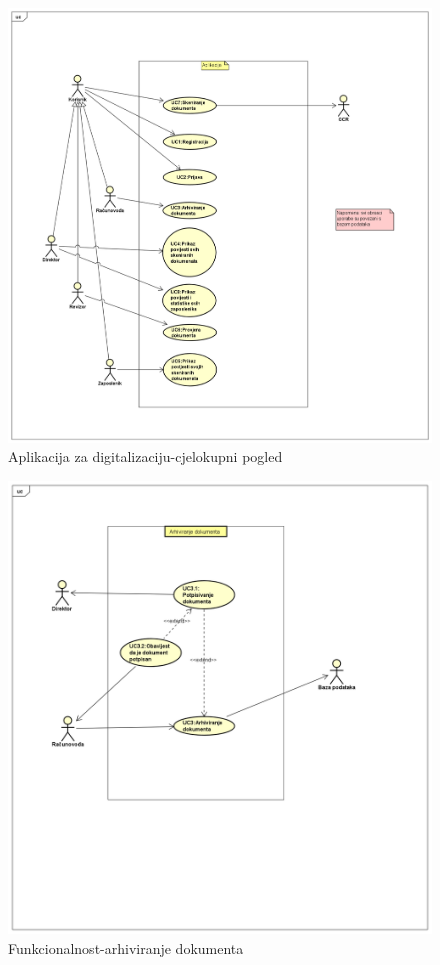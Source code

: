 \documentclass{article} %
\begin{document}
\begin{figure}
	\includegraphics[width=\linewidth]{Aplikacija za digitalizaciju-cjelokupni pogled.png}
	\caption{Aplikacija za digitalizaciju-cjelokupni pogled}
\end{figure}

\begin{figure}
	\includegraphics[width=\linewidth]{Aplikacija za digitalizaciju-arhiviranje dokumenta.png}
	\caption{Funkcionalnost-arhiviranje dokumenta}
\end{figure}
\end{document}
